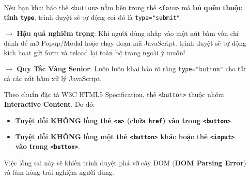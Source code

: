 \documentclass[11pt,oneside]{book}
\newcommand{\thd}[1]{\textcolor{white}{\textbf{\strut #1}}}
\newcommand{\codeinline}[1]{\textcolor{accentOrange}{\texttt{#1}}}
\newcommand{\term}[1]{\textbf{\textcolor{primaryBlue}{#1}}}
\begin{document}
\begin{prettyTableBox}
\end{prettyTableBox}

\begin{warnBox}
Nếu bạn khai báo thẻ \codeinline{<button>} nằm bên trong thẻ \codeinline{<form>} mà \textbf{bỏ quên thuộc tính \codeinline{type}}, trình duyệt sẽ tự động coi đó là \codeinline{type="submit"}. 
\par\vspace{3pt}
$\rightarrow$ \textbf{Hậu quả nghiêm trọng}: Khi người dùng nhấp vào một nút bấm vốn chỉ dành để mở Popup/Modal hoặc chạy đoạn mã JavaScript, trình duyệt sẽ tự động kích hoạt gửi form và reload lại toàn bộ trang ngoài ý muốn!
\par\vspace{3pt}
$\rightarrow$ \textbf{Quy Tắc Vàng Senior}: Luôn luôn khai báo rõ ràng \codeinline{type="button"} cho tất cả các nút bấm xử lý JavaScript.
\end{warnBox}

\begin{warnBox}
Theo chuẩn đặc tả W3C HTML5 Specification, thẻ \codeinline{<button>} thuộc nhóm \term{Interactive Content}. Do đó:
\begin{itemize}[leftmargin=1.5em, itemsep=2pt, parsep=0pt]
    \item \textbf{Tuyệt đối KHÔNG lồng thẻ \codeinline{<a>} (chứa \codeinline{href}) vào trong \codeinline{<button>}}.
    \item \textbf{Tuyệt đối KHÔNG lồng một thẻ \codeinline{<button>} khác hoặc thẻ \codeinline{<input>} vào trong \codeinline{<button>}}.
\end{itemize}
Việc lồng sai này sẽ khiến trình duyệt phá vỡ cây DOM (\term{DOM Parsing Error}) và làm hỏng trải nghiệm người dùng.
\end{warnBox}
\end{document}
